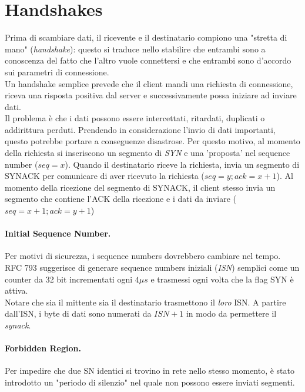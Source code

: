\section{Handshakes}
Prima di scambiare dati, il ricevente e il destinatario compiono una "stretta di mano" (\textit{handshake}):
questo si traduce nello stabilire che entrambi sono a conoscenza del fatto che l'altro vuole connettersi e che entrambi sono d'accordo sui parametri di connessione.\\
Un handshake semplice prevede che il client mandi una richiesta di connessione, riceva una risposta positiva dal server e successivamente possa iniziare ad inviare dati.\\
Il problema è che i dati possono essere intercettati, ritardati, duplicati o addirittura perduti. Prendendo in considerazione l'invio di dati importanti, questo potrebbe portare a conseguenze disastrose.
Per questo motivo, al momento della richiesta si inseriscono un segmento di \textit{SYN} e una 'proposta' nel sequence number ($ seq = x $). Quando il destinatario riceve la richiesta, invia un segmento di SYNACK per comunicare di aver ricevuto la richiesta ($ seq = y; ack = x+1 $). Al momento della ricezione del segmento di SYNACK, il client stesso invia un segmento che contiene l'ACK della ricezione e i dati da inviare ($ seq = x+1; ack = y+1 $)

\paragraph{Initial Sequence Number.}
Per motivi di sicurezza, i sequence numbers dovrebbero cambiare nel tempo. \\
RFC 793 suggerisce di generare sequence numbers iniziali (\textit{ISN}) semplici come un counter da 32 bit incrementati ogni $ 4 \mu s $ e trasmessi ogni volta che la flag SYN è attiva. \\
Notare che sia il mittente sia il destinatario trasmettono il \textit{loro} ISN. %
A partire dall'ISN, i byte di dati sono numerati da $ ISN+1 $ in modo da permettere il \textit{synack}.

\paragraph{Forbidden Region.} Per impedire che due SN identici si trovino in rete nello stesso momento, è stato introdotto un "periodo di silenzio" nel quale non possono essere inviati segmenti. %

